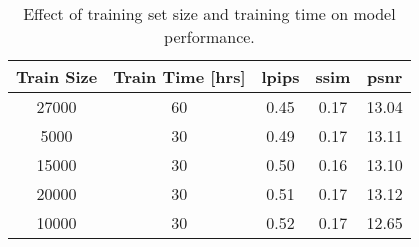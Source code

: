 \documentclass[11pt]{article}
\begin{document}
  \begin{table}[ht]
    \centering
    \begin{tabular}{cc|ccc}
    \toprule
    \textbf{Train Size} & \textbf{Train Time [hrs]} & \textbf{lpips} & \textbf{ssim} & \textbf{psnr} \\
    \midrule
    27000 & 60 & 0.45 & 0.17 & 13.04 \\
    5000 & 30 & 0.49 & 0.17 & 13.11 \\
    15000 & 30 & 0.50 & 0.16 & 13.10 \\
    20000 & 30 & 0.51 & 0.17 & 13.12 \\
    10000 & 30 & 0.52 & 0.17 & 12.65 \\
    \bottomrule
    \end{tabular}
    \caption{Effect of training set size and training time on model performance.}
    \label{tab:scale-study}
    \end{table}

\newpage


\end{document}
